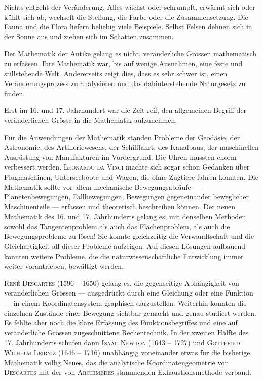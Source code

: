 \documentclass[%
<<<<<<< Updated upstream
11pt,%
twoside,%
titlepage,%
german,%
=======
11pt,%
twoside,%
titlepage,%
swissgerman,%
>>>>>>> Stashed changes
headsepline%
]{scrartcl}
\theoremstyle{definition}
\theoremstyle{plain}
\begin{document}
Nichts entgeht der Veränderung. Alles wächst oder schrumpft, erwärmt sich oder kühlt sich ab, wechselt die Stellung, die Farbe oder die Zusammensetzung. Die Fauna und die Flora liefern beliebig viele Beispiele. Selbst Felsen dehnen sich in der Sonne aus und ziehen sich im Schatten zusammen.

Der Mathematik der Antike gelang es nicht, veränderliche Grössen mathematisch zu erfassen. Ihre Mathematik war, bis auf wenige Ausnahmen, eine feste und stillstehende Welt. Andererseits zeigt dies, dass es sehr schwer ist, einen Veränderungsprozess zu analysieren und das dahinterstehende Naturgesetz zu finden.

Erst im 16. und 17. Jahrhundert war die Zeit reif, den allgemeinen Begriff der veränderlichen Grösse in die Mathematik aufzunehmen.

Für die Anwendungen der Mathematik standen Probleme der Geodäsie, der Astronomie, des Artilleriewesens, der Schifffahrt, des Kanalbaus, der maschinellen Ausrüstung von Manufakturen im Vordergrund. Die Uhren mussten enorm verbessert werden. \textsc{Leonardo da Vinci} machte sich sogar schon Gedanken über Flugmaschinen, Unterseeboote und Wagen, die ohne Zugtiere fahren konnten.
Die Mathematik sollte vor allem mechanische Bewegungsabläufe --- Planetenbewegungen, Fallbewegungen, Bewegungen gegeneinander beweglicher Maschinenteile --- erfassen und theoretisch beschreiben können.
Der neuen Mathematik des 16. und 17. Jahrhunderts gelang es, mit denselben Methoden sowohl das Tangentenproblem als auch das Flächenproblem, als auch die Bewegungsprobleme zu lösen! Sie konnte gleichzeitig die Verwandtschaft und die Gleichartigkeit all dieser Probleme aufzeigen. Auf diesen Lösungen aufbauend konnten weitere Probleme, die die naturwissenschaftliche Entwicklung immer weiter vorantrieben, bewältigt werden.

\textsc{Ren\'e Descartes} (1596 -- 1650) gelang es, die gegenseitige Abhängigkeit von veränderlichen Grössen --- ausgedrückt durch eine Gleichung oder eine Funk\-tion --- in einem Koordinatensystem graphisch darzustellen.
Weiterhin konnten die einzelnen Zustände einer Bewegung sichtbar gemacht und genau studiert werden.
Es fehlte aber noch die klare Erfassung des Funk\-tions\-begriffes und eine auf veränderliche Grössen zugeschnittene Rechentechnik.
In der zweiten Hälfte des 17. Jahrhunderts schufen dann \textsc{Isaac Newton} (1643 -- 1727) und \textsc{Gottfried Wilhelm Leibniz} (1646 -- 1716) unabhängig voneinander etwas für die bisherige Mathematik völlig Neues, das die analytische Koordinatengeometrie von \textsc{Descartes} mit der von \textsc{Archimedes} stammenden Exhaustionsmethode verband.
\end{document}
